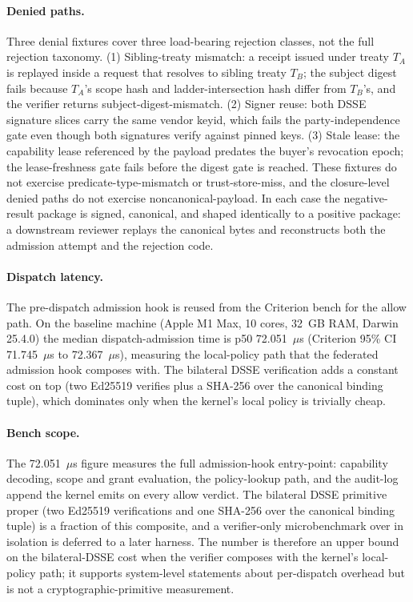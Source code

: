 \paragraph{Denied paths.} Three denial fixtures cover three load-bearing rejection classes, not the full rejection taxonomy. (1) Sibling-treaty mismatch: a receipt issued under treaty $T_A$ is replayed inside a request that resolves to sibling treaty $T_B$; the subject digest fails because $T_A$'s scope hash and ladder-intersection hash differ from $T_B$'s, and the verifier returns subject-digest-mismatch. (2) Signer reuse: both DSSE signature slices carry the same vendor keyid, which fails the party-independence gate even though both signatures verify against pinned keys. (3) Stale lease: the capability lease referenced by the payload predates the buyer's revocation epoch; the lease-freshness gate fails before the digest gate is reached. These fixtures do not exercise predicate-type-mismatch or trust-store-miss, and the closure-level denied paths do not exercise noncanonical-payload. In each case the negative-result package is signed, canonical, and shaped identically to a positive package: a downstream reviewer replays the canonical bytes and reconstructs both the admission attempt and the rejection code.

\paragraph{Dispatch latency.} The pre-dispatch admission hook is reused from the Criterion bench for the allow path. On the baseline machine (Apple M1 Max, 10 cores, 32~GB RAM, Darwin 25.4.0) the median dispatch-admission time is p50 72.051~$\mu$s (Criterion 95\% CI 71.745~$\mu$s to 72.367~$\mu$s), measuring the local-policy path that the federated admission hook composes with. The bilateral DSSE verification adds a constant cost on top (two Ed25519 verifies plus a SHA-256 over the canonical binding tuple), which dominates only when the kernel's local policy is trivially cheap.

\paragraph{Bench scope.} The 72.051~$\mu$s figure measures the full admission-hook entry-point: capability decoding, scope and grant evaluation, the policy-lookup path, and the audit-log append the kernel emits on every allow verdict. The bilateral DSSE primitive proper (two Ed25519 verifications and one SHA-256 over the canonical binding tuple) is a fraction of this composite, and a verifier-only microbenchmark over  in isolation is deferred to a later harness. The number is therefore an upper bound on the bilateral-DSSE cost when the verifier composes with the kernel's local-policy path; it supports system-level statements about per-dispatch overhead but is not a cryptographic-primitive measurement.


